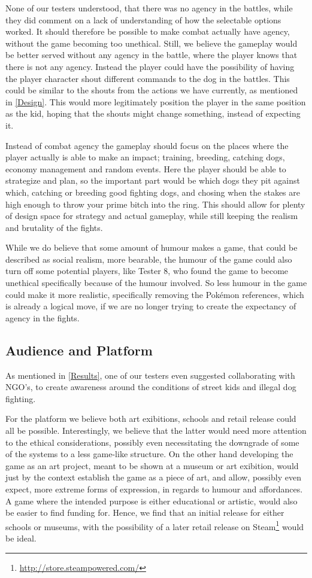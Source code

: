 None of our testers understood, that there was no agency in the battles, while they did comment on a lack of understanding of how the selectable options worked. It should therefore be possible to make combat actually have agency, without the game becoming too unethical. Still, we believe the gameplay would be better served without any agency in the battle, where the player knows that there is not any agency. Instead the player could have the possibility of having the player character shout different commands to the dog in the battles. This could be similar to the shouts from the actions we have currently, as mentioned in \ref{Design}. This would more legitimately position the player in the same position as the kid, hoping that the shouts might change something, instead of expecting it.\

Instead of combat agency the gameplay should focus on the places where the player actually is able to make an impact; training, breeding, catching dogs, economy management and random events. Here the player should be able to strategize and plan, so the important part would be which dogs they pit against which, catching or breeding good fighting dogs, and chosing when the stakes are high enough to throw your prime bitch into the ring. This should allow for plenty of design space for strategy and actual gameplay, while still keeping the realism and brutality of the fights. \

While we do believe that some amount of humour makes a game, that could be described as social realism, more bearable, the humour of the game could also turn off some potential players, like Tester 8, who found the game to become unethical specifically because of the humour involved. So less humour in the game could make it more realistic, specifically removing the Pokémon references, which is already a logical move, if we are no longer trying to create the expectancy of agency in the fights.\

\subsection{Audience and Platform}

As mentioned in \ref{Results}, one of our testers even suggested collaborating with NGO's, to create awareness around the conditions of street kids and illegal dog fighting. \

For the platform we believe both art exibitions, schools and retail release could all be possible. Interestingly, we believe that the latter would need more attention to the ethical considerations, possibly even necessitating the downgrade of some of the systems to a less game-like structure. On the other hand developing the game as an art project, meant to be shown at a museum or art exibition, would just by the context establish the game as a piece of art, and allow, possibly even expect, more extreme forms of expression, in regards to humour and affordances.
A game where the intended purpose is either educational or artistic, would also be easier to find funding for. 
Hence, we find that an initial release for either schools or museums, with the possibility of a later retail release on Steam\footnote{\url{http://store.steampowered.com/}} would be ideal.\

